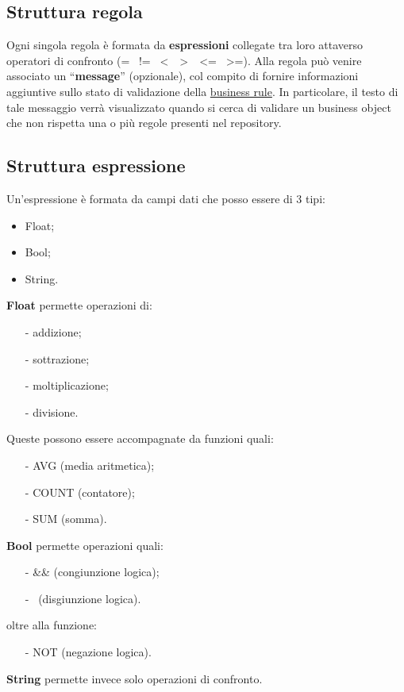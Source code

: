 \subsection{Struttura regola}
Ogni singola regola \`e formata da \textbf{espressioni} collegate tra loro attaverso operatori di confronto (= \textbar\ != \textbar\ \textless\ \textbar\ \textgreater\ \textbar\ \textless= \textbar\ \textgreater=). Alla regola pu\`o venire associato un ``\textbf{message}'' (opzionale), col compito di fornire informazioni aggiuntive sullo stato di validazione della \underline{business rule}. In particolare, il testo di tale messaggio verr\`a visualizzato quando si cerca di validare un business object che non rispetta una o pi\`u regole presenti nel repository.
\subsection{Struttura espressione}
Un'espressione \`e formata da campi dati che posso essere di 3 tipi:
\begin{itemize}
\item Float;
\item Bool;
\item String. 
\end{itemize}
\textbf{Float} permette operazioni di:
\begin{itemize}
\item[-] addizione;
\item[-] sottrazione;
\item[-] moltiplicazione;
\item[-] divisione.
\end{itemize}
Queste possono essere accompagnate da funzioni quali:
\begin{itemize}
\item[-] AVG (media aritmetica);
\item[-] COUNT (contatore);
\item[-] SUM (somma). 
\end{itemize}
\textbf{Bool} permette operazioni quali:
\begin{itemize}
\item[-] \&\& (congiunzione logica);
\item[-] \textbar\textbar\ (disgiunzione logica).
\end{itemize}
oltre alla funzione:
\begin{itemize}
\item[-] NOT (negazione logica). 
\end{itemize}
\textbf{String} permette invece solo operazioni di confronto.
